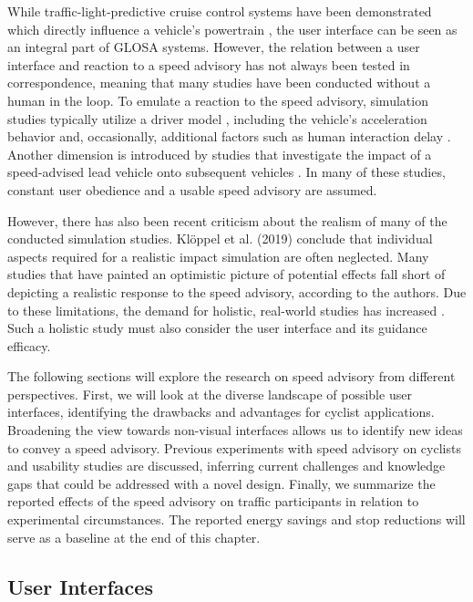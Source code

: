 While traffic-light-predictive cruise control systems have been demonstrated which directly influence a vehicle's powertrain \cite{raubitschek_predictive_2011}, the user interface can be seen as an integral part of GLOSA systems. However, the relation between a user interface and reaction to a speed advisory has not always been tested in correspondence, meaning that many studies have been conducted without a human in the loop. To emulate a reaction to the speed advisory, simulation studies typically utilize a driver model \cite{hu_lane-level_2023}, including the vehicle's acceleration behavior and, occasionally, additional factors such as human interaction delay \cite{schlamp_2023_glosa}. Another dimension is introduced by studies that investigate the impact of a speed-advised lead vehicle onto subsequent vehicles \cite{preuk_does_2016, preuk_should_2018}. In many of these studies, constant user obedience and a usable speed advisory are assumed.

However, there has also been recent criticism about the realism of many of the conducted simulation studies. Klöppel et al. (2019) \cite{kloeppel_performance_2019} conclude that individual aspects required for a realistic impact simulation are often neglected. Many studies that have painted an optimistic picture of potential effects fall short of depicting a realistic response to the speed advisory, according to the authors. Due to these limitations, the demand for holistic, real-world studies has increased \cite{stahlmann_exploring_2018}. Such a holistic study must also consider the user interface and its guidance efficacy. 

The following sections will explore the research on speed advisory from different perspectives. First, we will look at the diverse landscape of possible user interfaces, identifying the drawbacks and advantages for cyclist applications. Broadening the view towards non-visual interfaces allows us to identify new ideas to convey a speed advisory. Previous experiments with speed advisory on cyclists and usability studies are discussed, inferring current challenges and knowledge gaps that could be addressed with a novel design. Finally, we summarize the reported effects of the speed advisory on traffic participants in relation to experimental circumstances. The reported energy savings and stop reductions will serve as a baseline at the end of this chapter.

\subsection{User Interfaces}

